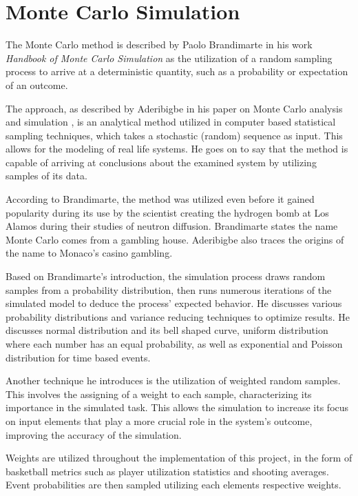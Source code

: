 \documentclass{thesis-ekf}
\theoremstyle{definition}
\theoremstyle{remark}
\begin{document}
\section{Monte Carlo Simulation} \label{sec-monte-carlo}

The Monte Carlo method is described by Paolo Brandimarte in his work \emph{Handbook of Monte Carlo Simulation} \cite{brandimarte} as the utilization of a random sampling process to arrive at a deterministic quantity, such as a probability or expectation of an outcome. 

The approach, as described by Aderibigbe in his paper on Monte Carlo analysis and simulation \cite{Aderibigbe}, is an analytical method utilized in computer based statistical sampling techniques, which takes a stochastic (random) sequence as input. This allows for the modeling of real life systems. He goes on to say that the method is capable of arriving at conclusions about the examined system by utilizing samples of its data.

According to Brandimarte, the method was utilized even before it gained popularity during its use by the scientist creating the hydrogen bomb at Los Alamos during their studies of neutron diffusion. Brandimarte states the name Monte Carlo comes from a gambling house. Aderibigbe also traces the origins of the name to Monaco's casino gambling. 

Based on Brandimarte's introduction, the simulation process draws random samples from a probability distribution, then runs numerous iterations of the simulated model to deduce the process' expected behavior. He discusses various probability distributions and variance reducing techniques to optimize results. He discusses normal distribution and its bell shaped curve, uniform distribution where each number has an equal probability, as well as exponential and Poisson distribution for time based events. 

Another technique he introduces is the utilization of weighted random samples. This involves the assigning of a weight to each sample, characterizing its importance in the simulated task. This allows the simulation to increase its focus on input elements that play a more crucial role in the system's outcome, improving the accuracy of the simulation.

Weights are utilized throughout the implementation of this project, in the form of basketball metrics such as player utilization statistics and shooting averages. Event probabilities are then sampled utilizing each elements respective weights.
\end{document}
